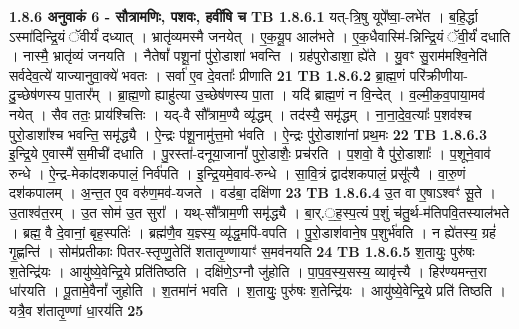 \documentclass[17pt]{extarticle}
\begin{document}
                \textbf{ 1.8.6     अनुवाकं   6 - सौत्रामणिः, पशवः, हवींषि च} \newline
                                \textbf{ TB 1.8.6.1} \newline
                  यत्-त्रि॒षु यूपे᳚ष्वा॒-लभे॑त । ब॒हि॒र्द्धा ऽस्मा॑दिन्द्रि॒यं ॅवीर्यं॑ दध्यात् । भ्रातृ॑व्यमस्मै जनयेत् । ए॒क॒यू॒प आल॑भते । ए॒क॒धैवास्मि॑-न्निन्द्रि॒यं ॅवी॒र्यं॑ दधाति । नास्मै॒ भ्रातृ॑व्यं जनयति । नैतेषां᳚ पशू॒नां पु॑रो॒डाशा॑ भवन्ति । ग्रह॑पुरोडाशा॒ ह्ये॑ते । यु॒वꣳ सु॒राम॑मश्वि॒नेति॑ सर्वदेव॒त्ये॑ याज्यानुवा॒क्ये॑ भवतः । सर्वा॑ ए॒व दे॒वताः᳚ प्रीणाति \textbf{ 21} \newline
                  \newline
                                \textbf{ TB 1.8.6.2} \newline
                  ब्रा॒ह्म॒णं परि॑क्रीणीया-दु॒च्छेष॑णस्य पा॒तार᳚म् । ब्रा॒ह्म॒णो ह्याहु॑त्या उ॒च्छेष॑णस्य पा॒ता । यदि॑ ब्राह्म॒णं न वि॒न्देत् । व॒ल्मी॒क॒व॒पाया॒मव॑ नयेत् । सैव ततः॒ प्राय॑श्चित्तिः । यद्-वै सौ᳚त्राम॒ण्यै व्यृ॑द्धम् । तद॑स्यै॒ समृ॑द्धम् । ना॒ना॒दे॒व॒त्याः᳚ प॒शव॑श्च पुरो॒डाशा᳚श्च भवन्ति॒ समृ॑द्ध्यै । ऐ॒न्द्रः प॑शू॒नामु॑त्त॒मो भ॑वति । ऐ॒न्द्रः पु॑रो॒डाशा॑नां प्रथ॒मः \textbf{ 22} \newline
                  \newline
                                \textbf{ TB 1.8.6.3} \newline
                  इ॒न्द्रि॒ये ए॒वास्मै॑ स॒मीची॑ दधाति । पु॒रस्ता॑-दनूया॒जानां᳚ पुरो॒डाशैः॒ प्रच॑रति । प॒शवो॒ वै पु॑रो॒डाशाः᳚ । प॒शूने॒वाव॑ रुन्धे । ऐ॒न्द्र-मेका॑दशकपालं॒ निर्व॑पति । इ॒न्द्रि॒यमे॒वाव॑-रुन्धे । सा॒वि॒त्रं द्वाद॑शकपालं॒ प्रसू᳚त्यै । वा॒रु॒णं दश॑कपालम् । अ॒न्त॒त ए॒व वरु॑ण॒मव॑-यजते । वड॑बा॒ दक्षि॑णा \textbf{ 23} \newline
                  \newline
                                \textbf{ TB 1.8.6.4} \newline
                  उ॒त वा ए॒षाऽश्वꣳ॑ सू॒ते । उ॒ताश्व॑त॒रम् । उ॒त सोम॑ उ॒त सुरा᳚ । यथ्-सौ᳚त्राम॒णी समृ॑द्ध्यै । बा॒र्.॒ह॒स्प॒त्यं प॒शुं च॑तु॒र्थ-म॑तिपवि॒तस्याल॑भते । ब्रह्म॒ वै दे॒वानां॒ बृह॒स्पतिः॑ । ब्रह्म॑णै॒व य॒ज्ञ्स्य॒ व्यृ॑द्ध॒मपि॑-वपति । पु॒रो॒डाश॑वाने॒ष प॒शुर्भ॑वति । न ह्ये॑तस्य॒ ग्रहं॑ गृ॒ह्णन्ति॑ । सोम॑प्रतीकाः पितर-स्तृप्णु॒तेति॑ शतातृ॒ण्णायाꣳ॑ स॒मव॑नयति \textbf{ 24} \newline
                  \newline
                                \textbf{ TB 1.8.6.5} \newline
                  श॒तायुः॒ पुरु॑षः श॒तेन्द्रि॑यः । आयु॑ष्ये॒वेन्द्रि॒ये प्रति॑तिष्ठति । दक्षि॑णे॒ऽग्नौ जु॑होति । पा॒प॒व॒स्य॒सस्य॒ व्यावृ॑त्त्यै । हिर॑ण्यमन्त॒रा धा॑रयति । पू॒तामे॒वैनां᳚ जुहोति । श॒तमा॑नं भवति । श॒तायुः॒ पुरु॑षः श॒तेन्द्रि॑यः । आयु॑ष्ये॒वेन्द्रि॒ये प्रति॑ तिष्ठति । यत्रै॒व श॑तातृ॒ण्णां धा॒रय॑ति \textbf{ 25} \newline
\end{document}
